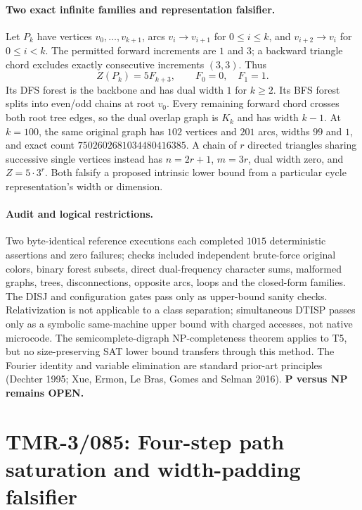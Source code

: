\documentclass[11pt]{article}
\begin{document}
\paragraph{Two exact infinite families and representation falsifier.}
Let $P_k$ have vertices $v_0,\ldots,v_{k+1}$, arcs
$v_i\to v_{i+1}$ for $0\le i\le k$, and
$v_{i+2}\to v_i$ for $0\le i<k$. The permitted forward
increments are $1$ and $3$; a backward triangle chord
excludes exactly consecutive increments $(3,3)$. Thus
\[
 \boxed{Z(P_k)=5F_{k+3}},\qquad F_0=0,\quad F_1=1.
\]
Its DFS forest is the backbone and has dual width $1$ for
$k\ge2$. Its BFS forest splits into even/odd chains at root
$v_0$. Every remaining forward chord crosses both root tree
edges, so the dual overlap graph is $K_k$ and has width $k-1$.
At $k=100$, the same original graph has $102$ vertices and
$201$ arcs, widths $99$ and $1$, and exact count
$7502602681034480416385$.
A chain of $r$ directed triangles sharing successive single
vertices instead has $n=2r+1$, $m=3r$, dual width zero, and
$Z=5\cdot3^r$. Both falsify a proposed intrinsic lower bound
from a particular cycle representation's width or dimension.

\paragraph{Audit and logical restrictions.}
Two byte-identical reference executions each completed $1015$
deterministic assertions and zero failures; checks included
independent brute-force original colors, binary forest subsets,
direct dual-frequency character sums, malformed graphs, trees,
disconnections, opposite arcs, loops and the closed-form families.
The DISJ and configuration gates pass only as upper-bound
sanity checks. Relativization is not applicable to a class
separation; simultaneous DTISP passes only as a symbolic
same-machine upper bound with charged accesses, not native
microcode. The semicomplete-digraph NP-completeness theorem
applies to T5, but no size-preserving SAT lower bound transfers
through this method. The Fourier identity and variable elimination
are standard prior-art principles (Dechter 1995; Xue, Ermon,
Le Bras, Gomes and Selman 2016). \textbf{P versus NP remains OPEN.}



\section{TMR-3/085: Four-step path saturation and width-padding falsifier}
\end{document}
